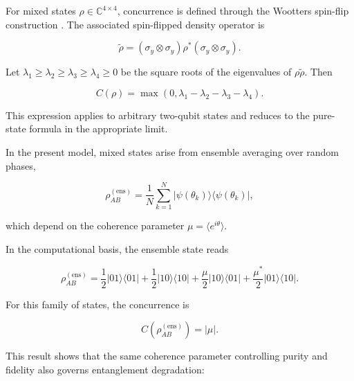 \medskip

For mixed states \( \rho \in \mathbb{C}^{4 \times 4} \), concurrence is defined through the Wootters spin-flip construction \cite{wootters_entanglement_1998}. The associated spin-flipped density operator is

\begin{equation}
\tilde{\rho}
=
(\sigma_y \otimes \sigma_y)
\rho^*
(\sigma_y \otimes \sigma_y).
\label{eq:spin_flipped_density_matrix}
\end{equation}

Let \( \lambda_1 \ge \lambda_2 \ge \lambda_3 \ge \lambda_4 \ge 0 \) be the square roots of the eigenvalues of \( \rho\tilde{\rho} \). Then

\begin{equation}
C(\rho)
=
\max
\left(
0,
\lambda_1-\lambda_2-\lambda_3-\lambda_4
\right).
\label{eq:mixed_state_concurrence}
\end{equation}

This expression applies to arbitrary two-qubit states and reduces to the pure-state formula in the appropriate limit.

\medskip

In the present model, mixed states arise from ensemble averaging over random phases,

\[
\rho_{AB}^{(\mathrm{ens})}
=
\frac{1}{N}
\sum_{k=1}^{N}
|\psi(\theta_k)\rangle\langle\psi(\theta_k)|,
\]

which depend on the coherence parameter
\(
\mu
=
\langle e^{i\theta}\rangle.
\)

\medskip

In the computational basis, the ensemble state reads

\begin{equation}
\rho_{AB}^{(\mathrm{ens})}
=
\frac{1}{2}|01\rangle\langle 01|
+
\frac{1}{2}|10\rangle\langle 10|
+
\frac{\mu}{2}|10\rangle\langle 01|
+
\frac{\mu^*}{2}|01\rangle\langle 10|.
\label{eq:random_phase_ensemble_density_explicit}
\end{equation}

For this family of states, the concurrence is

\begin{equation}
C
\left(
\rho_{AB}^{(\mathrm{ens})}
\right)
=
|\mu|.
\label{eq:random_phase_ensemble_concurrence}
\end{equation}

\medskip

This result shows that the same coherence parameter controlling purity and fidelity also governs entanglement degradation:

